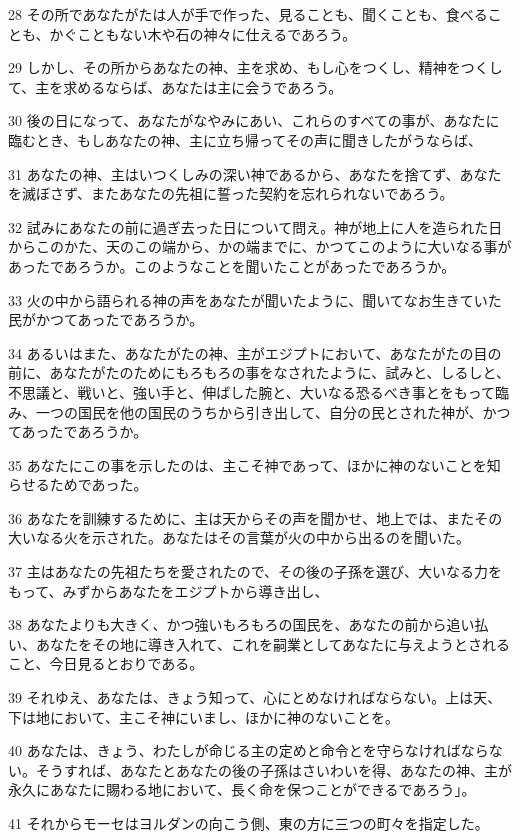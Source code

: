 \par 28 その所であなたがたは人が手で作った、見ることも、聞くことも、食べることも、かぐこともない木や石の神々に仕えるであろう。
\par 29 しかし、その所からあなたの神、主を求め、もし心をつくし、精神をつくして、主を求めるならば、あなたは主に会うであろう。
\par 30 後の日になって、あなたがなやみにあい、これらのすべての事が、あなたに臨むとき、もしあなたの神、主に立ち帰ってその声に聞きしたがうならば、
\par 31 あなたの神、主はいつくしみの深い神であるから、あなたを捨てず、あなたを滅ぼさず、またあなたの先祖に誓った契約を忘れられないであろう。
\par 32 試みにあなたの前に過ぎ去った日について問え。神が地上に人を造られた日からこのかた、天のこの端から、かの端までに、かつてこのように大いなる事があったであろうか。このようなことを聞いたことがあったであろうか。
\par 33 火の中から語られる神の声をあなたが聞いたように、聞いてなお生きていた民がかつてあったであろうか。
\par 34 あるいはまた、あなたがたの神、主がエジプトにおいて、あなたがたの目の前に、あなたがたのためにもろもろの事をなされたように、試みと、しるしと、不思議と、戦いと、強い手と、伸ばした腕と、大いなる恐るべき事とをもって臨み、一つの国民を他の国民のうちから引き出して、自分の民とされた神が、かつてあったであろうか。
\par 35 あなたにこの事を示したのは、主こそ神であって、ほかに神のないことを知らせるためであった。
\par 36 あなたを訓練するために、主は天からその声を聞かせ、地上では、またその大いなる火を示された。あなたはその言葉が火の中から出るのを聞いた。
\par 37 主はあなたの先祖たちを愛されたので、その後の子孫を選び、大いなる力をもって、みずからあなたをエジプトから導き出し、
\par 38 あなたよりも大きく、かつ強いもろもろの国民を、あなたの前から追い払い、あなたをその地に導き入れて、これを嗣業としてあなたに与えようとされること、今日見るとおりである。
\par 39 それゆえ、あなたは、きょう知って、心にとめなければならない。上は天、下は地において、主こそ神にいまし、ほかに神のないことを。
\par 40 あなたは、きょう、わたしが命じる主の定めと命令とを守らなければならない。そうすれば、あなたとあなたの後の子孫はさいわいを得、あなたの神、主が永久にあなたに賜わる地において、長く命を保つことができるであろう」。
\par 41 それからモーセはヨルダンの向こう側、東の方に三つの町々を指定した。
